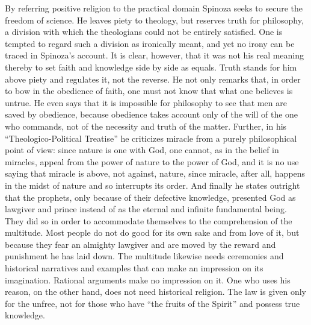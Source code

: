 \documentclass[12pt]{book}
\newcommand{\opage}[1]{\marginnote{\footnotesize\textit{[#1]}}}
\begin{document}
By referring positive religion to the practical domain Spinoza seeks to secure the
freedom of science. He leaves piety to theology, but reserves truth for philosophy, a
division with which the theologians could not be entirely satisfied. One is tempted to
regard such a division as ironically meant, and yet no irony can be traced in Spinoza's
account. It is clear, however, that it was not his real meaning thereby to set faith and
knowledge side by side as equals. Truth stands for him above piety and regulates it, not
the reverse. \opage{160}He not only remarks that, in order to bow in the obedience of
faith, one must not know that what one believes is untrue. He even says that it is
impossible for philosophy to see that men are saved by obedience, because obedience takes
account only of the will of the one who commands, not of the necessity and truth of the
matter. Further, in his ``Theologico-Political Treatise'' he criticizes miracle from a
purely philosophical point of view: since nature is one with God, one cannot, as in the
belief in miracles, appeal from the power of nature to the power of God, and it is no use
saying that miracle is above, not against, nature, since miracle, after all, happens in
the midst of nature and so interrupts its order. And finally he states outright that the
prophets, only because of their defective knowledge, presented God as lawgiver and prince
instead of as the eternal and infinite fundamental being. They did so in order to
accommodate themselves to the comprehension of the multitude. Most people do not do good
for its own sake and from love of it, but because they fear an almighty lawgiver and are
moved by the reward and punishment he has laid down. The multitude likewise needs
ceremonies and historical narratives and examples that can make an impression on its
imagination. Rational arguments make no impression on it. One who uses his reason, on the
other hand, does not need historical religion. The law is given only for the unfree, not
for those who have ``the fruits of the Spirit'' and possess true knowledge.
\end{document}
